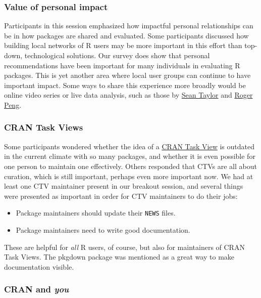 \subsubsection{Value of personal impact}\label{value-of-personal-impact}

Participants in this session emphasized how impactful personal
relationships can be in how packages are shared and evaluated. Some
participants discussed how building local networks of R users may be
more important in this effort than top-down, technological solutions.
Our survey does show that personal recommendations have been important
for many individuals in evaluating R packages. This is yet another area
where local user groups can continue to have important impact. Some ways
to share this experience more broadly would be online video series or
live data analysis, such as those by
\href{https://www.facebook.com/seanjtaylor/videos/10103088186201897/?pnref=story}{Sean
Taylor} and
\href{https://twitter.com/rdpeng/status/872090694390861824}{Roger Peng}.

\subsubsection{CRAN Task Views}\label{cran-task-views}

Some participants wondered whether the idea of a
\href{https://cran.r-project.org/web/views/}{CRAN Task View} is outdated
in the current climate with so many packages, and whether it is even
possible for one person to maintain one effectively. Others responded
that CTVs are all about curation, which is still important, perhaps even
more important now. We had at least one CTV maintainer present in our
breakout session, and several things were presented as important in
order for CTV maintainers to do their jobs:

\begin{itemize}
\tightlist
\item
  Package maintainers should update their \texttt{NEWS} files.
\item
  Package maintainers need to write good documentation.
\end{itemize}

These are helpful for \emph{all} R users, of course, but also for
maintainers of CRAN Task Views. The pkgdown \citep{pkgdown} package was
mentioned as a great way to make documentation visible.

\subsubsection{\texorpdfstring{CRAN and
\emph{you}}{CRAN and you}}\label{cran-and-you}


